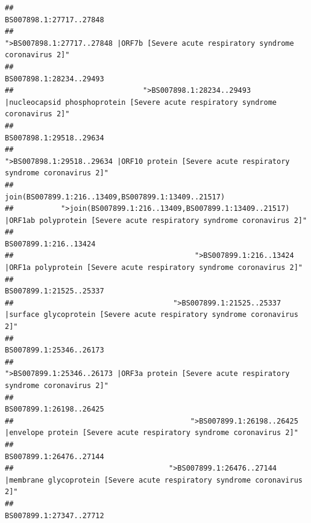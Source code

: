 \documentclass[
]{article}
\begin{document}
\begin{verbatim}
##                                                                                                                BS007898.1:27717..27848 
##                                                    ">BS007898.1:27717..27848 |ORF7b [Severe acute respiratory syndrome coronavirus 2]" 
##                                                                                                                BS007898.1:28234..29493 
##                              ">BS007898.1:28234..29493 |nucleocapsid phosphoprotein [Severe acute respiratory syndrome coronavirus 2]" 
##                                                                                                                BS007898.1:29518..29634 
##                                            ">BS007898.1:29518..29634 |ORF10 protein [Severe acute respiratory syndrome coronavirus 2]" 
##                                                                                    join(BS007899.1:216..13409,BS007899.1:13409..21517) 
##           ">join(BS007899.1:216..13409,BS007899.1:13409..21517) |ORF1ab polyprotein [Severe acute respiratory syndrome coronavirus 2]" 
##                                                                                                                  BS007899.1:216..13424 
##                                          ">BS007899.1:216..13424 |ORF1a polyprotein [Severe acute respiratory syndrome coronavirus 2]" 
##                                                                                                                BS007899.1:21525..25337 
##                                     ">BS007899.1:21525..25337 |surface glycoprotein [Severe acute respiratory syndrome coronavirus 2]" 
##                                                                                                                BS007899.1:25346..26173 
##                                            ">BS007899.1:25346..26173 |ORF3a protein [Severe acute respiratory syndrome coronavirus 2]" 
##                                                                                                                BS007899.1:26198..26425 
##                                         ">BS007899.1:26198..26425 |envelope protein [Severe acute respiratory syndrome coronavirus 2]" 
##                                                                                                                BS007899.1:26476..27144 
##                                    ">BS007899.1:26476..27144 |membrane glycoprotein [Severe acute respiratory syndrome coronavirus 2]" 
##                                                                                                                BS007899.1:27347..27712 

\end{verbatim}
\end{document}
